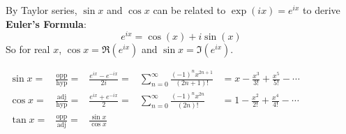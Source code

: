 By Taylor series, $\sin{x}$ and $\cos{x}$ can be related to $\exp{(ix)} = e^{ix}$ to derive \textbf{Euler's Formula}: $$e^{ix} = \cos{(x)} + i\sin{(x)}$$ So for real $x$, $\cos{x} = \Re{(e^{ix})}$ and $\sin{x} = \Im{(e^{ix})}$.

\begin{center}
	$\begin{array}{ccllc}
		\sin{x} =& \frac{\text{opp}}{\text{hyp}} =& \frac{e^{ix}-e^{-ix}}{2i} =& \sum_{n=0}^{\infty} \frac{(-1)^{n}x^{2n+1}}{(2n+1)!} &= x - \frac{x^3}{3!} + \frac{x^5}{5!} - \cdots\\
		\cos{x} =& \frac{\text{adj}}{\text{hyp}} =& \frac{e^{ix}+e^{-ix}}{2} =& \sum_{n=0}^{\infty} \frac{(-1)^{n}x^{2n}}{(2n)!} &= 1 - \frac{x^2}{2!} + \frac{x^4}{4!} - \cdots\\
		\tan{x} =& \frac{\text{opp}}{\text{adj}} =& \frac{\sin{x}}{\cos{x}}&
	\end{array}$
\end{center}


